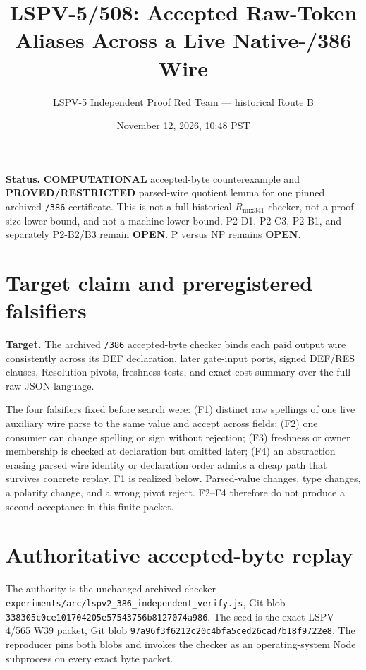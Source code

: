 \documentclass[11pt]{article}
\title{LSPV-5/508: Accepted Raw-Token Aliases Across a Live Native-/386 Wire}
\author{LSPV-5 Independent Proof Red Team --- historical Route B}
\date{November 12, 2026, 10:48 PST}
\begin{document}
\maketitle

\noindent\textbf{Status.} \textbf{COMPUTATIONAL} accepted-byte counterexample and
\textbf{PROVED/RESTRICTED} parsed-wire quotient lemma for one pinned archived
\texttt{/386} certificate.  This is not a full historical
$R_{\mathrm{mix341}}$ checker, not a proof-size lower bound, and not a machine
lower bound.  P2-D1, P2-C3, P2-B1, and separately P2-B2/B3 remain
\textbf{OPEN}.  P versus NP remains \textbf{OPEN}.

\section*{Target claim and preregistered falsifiers}
\textbf{Target.}  The archived \texttt{/386} accepted-byte checker binds each
paid output wire consistently across its DEF declaration, later gate-input
ports, signed DEF/RES clauses, Resolution pivots, freshness tests, and exact
cost summary over the full raw JSON language.

The four falsifiers fixed before search were: (F1) distinct raw spellings of one
live auxiliary wire parse to the same value and accept across fields; (F2) one
consumer can change spelling or sign without rejection; (F3) freshness or owner
membership is checked at declaration but omitted later; (F4) an abstraction
erasing parsed wire identity or declaration order admits a cheap path that
survives concrete replay.  F1 is realized below.  Parsed-value changes, type
changes, a polarity change, and a wrong pivot reject.  F2--F4 therefore do not
produce a second acceptance in this finite packet.

\section*{Authoritative accepted-byte replay}
The authority is the unchanged archived checker
\texttt{experiments/arc/lspv2\_386\_independent\_verify.js}, Git blob
\texttt{338305c0ce101704205e57543756b8127074a986}.  The seed is the exact
LSPV-4/565 W39 packet, Git blob
\texttt{97a96f3f6212c20c4bfa5ced26cad7b18f9722e8}.  The reproducer pins both
blobs and invokes the checker as an operating-system Node subprocess on every
exact byte packet.
\end{document}
